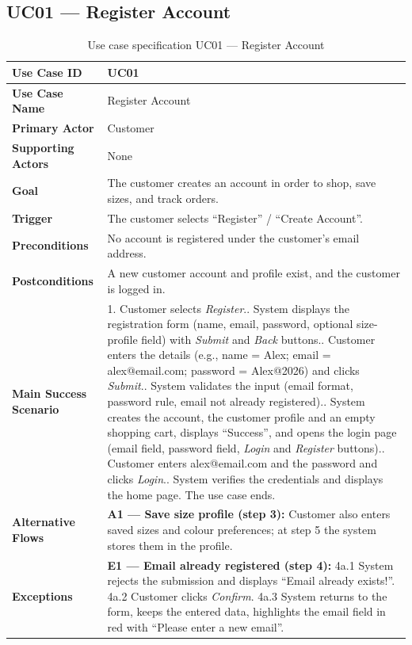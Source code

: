\documentclass[11pt,a4paper,oneside]{extreport}
\newcommand{\ucrow}[2]{\textbf{#1} & #2 \\ \midrule}
\begin{document}
\subsection{UC01 --- Register Account}
{\small
\begin{xltabular}{\textwidth}{@{}L{3.1cm} Y@{}}
\caption{Use case specification UC01 --- Register Account}\label{tab:uc01}\\
\toprule
\endfirsthead
\toprule
\endhead
\bottomrule
\endlastfoot
\ucrow{Use Case ID}{UC01}
\ucrow{Use Case Name}{Register Account}
\ucrow{Primary Actor}{Customer}
\ucrow{Supporting Actors}{None}
\ucrow{Goal}{The customer creates an account in order to shop, save sizes, and track orders.}
\ucrow{Trigger}{The customer selects ``Register'' / ``Create Account''.}
\ucrow{Preconditions}{No account is registered under the customer's email address.}
\ucrow{Postconditions}{A new customer account and profile exist, and the customer is logged in.}
\ucrow{Main Success Scenario}{%
1. Customer selects \emph{Register}.\newline
2. System displays the registration form (name, email, password, optional size-profile field) with \emph{Submit} and \emph{Back} buttons.\newline
3. Customer enters the details (e.g., name = Alex; email = alex@email.com; password = Alex@2026) and clicks \emph{Submit}.\newline
4. System validates the input (email format, password rule, email not already registered).\newline
5. System creates the account, the customer profile and an empty shopping cart, displays ``Success'', and opens the login page (email field, password field, \emph{Login} and \emph{Register} buttons).\newline
6. Customer enters alex@email.com and the password and clicks \emph{Login}.\newline
7. System verifies the credentials and displays the home page. The use case ends.}
\ucrow{Alternative Flows}{\textbf{A1 --- Save size profile (step 3):} Customer also enters saved sizes and colour preferences; at step 5 the system stores them in the profile.}
\ucrow{Exceptions}{%
\textbf{E1 --- Email already registered (step 4):}\newline
4a.1 System rejects the submission and displays ``Email already exists!''.\newline
4a.2 Customer clicks \emph{Confirm}.\newline
4a.3 System returns to the form, keeps the entered data, highlights the email field in red with ``Please enter a new email''.\newline
}
\end{xltabular}}
\end{document}
